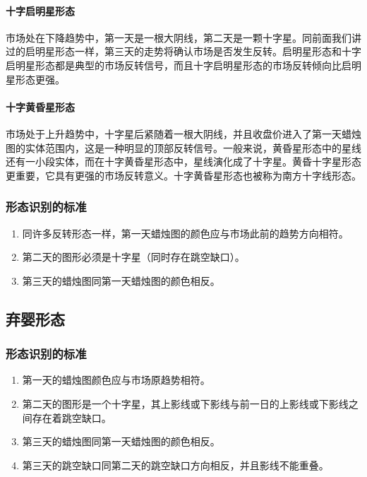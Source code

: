 \paragraph{十字启明星形态} 市场处在下降趋势中，第一天是一根大阴线，第二天是一颗十字星。同前面我们讲过的启明星形态一样，第三天的走势将确认市场是否发生反转。启明星形态和十字启明星形态都是典型的市场反转信号，而且十字启明星形态的市场反转倾向比启明星形态更强。

\paragraph{十字黄昏星形态} 市场处于上升趋势中，十字星后紧随着一根大阴线，并且收盘价进入了第一天蜡烛图的实体范围内，这是一种明显的顶部反转信号。一般来说，黄昏星形态中的星线还有一小段实体，而在十字黄昏星形态中，星线演化成了十字星。黄昏十字星形态更重要，它具有更强的市场反转意义。十字黄昏星形态也被称为南方十字线形态。
\subsubsection*{形态识别的标准}
\begin{enumerate}
    \item 同许多反转形态一样，第一天蜡烛图的颜色应与市场此前的趋势方向相符。
    \item 第二天的图形必须是十字星（同时存在跳空缺口）。
    \item 第三天的蜡烛图同第一天蜡烛图的颜色相反。
\end{enumerate}
\subsection{弃婴形态}
\subsubsection*{形态识别的标准}
\begin{enumerate}
    \item 第一天的蜡烛图颜色应与市场原趋势相符。
    \item 第二天的图形是一个十字星，其上影线或下影线与前一日的上影线或下影线之间存在着跳空缺口。
    \item 第三天的蜡烛图同第一天蜡烛图的颜色相反。
    \item 第三天的跳空缺口同第二天的跳空缺口方向相反，并且影线不能重叠。
\end{enumerate}
